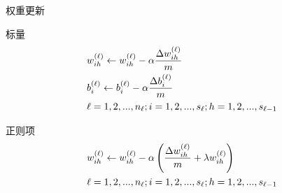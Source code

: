 \begin{frame}{权重更新}

\begin{block}{标量}
\[\begin{gathered}
  w_{ih}^{(\ell )} \leftarrow w_{ih}^{(\ell )} - \alpha \frac{{\Delta w_{ih}^{(\ell )}}}{m} \hfill \\
  b_i^{(\ell )} \leftarrow b_i^{(\ell )} - \alpha \frac{{\Delta b_i^{(\ell )}}}{m} \hfill \\
  \ell  = 1,2,...,{n_\ell };i = 1,2,...,{s_\ell };h = 1,2,...,{s_{\ell  - 1}} \hfill \\ 
\end{gathered} \]
\end{block}

\begin{block}{正则项}
\[\begin{gathered}
  w_{ih}^{(\ell )} \leftarrow w_{ih}^{(\ell )} - \alpha \left( {\frac{{\Delta w_{ih}^{(\ell )}}}{m} + \lambda w_{ih}^{(\ell )}} \right) \hfill \\
  \ell  = 1,2,...,{n_\ell };i = 1,2,...,{s_\ell };h = 1,2,...,{s_{\ell  - 1}} \hfill \\ 
\end{gathered} \]
\end{block}

\end{frame}
